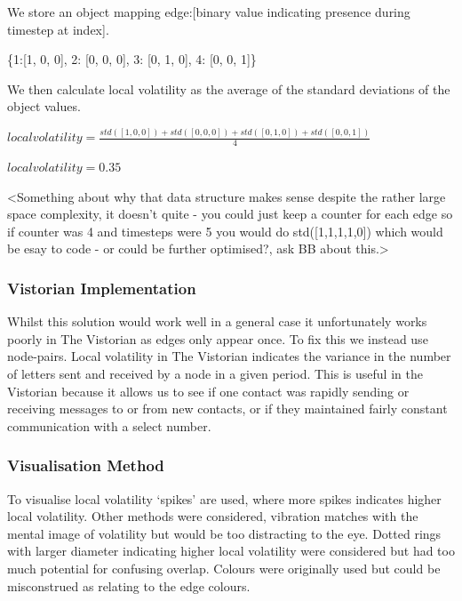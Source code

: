 We store an object mapping edge:[binary value indicating presence during timestep at index].
\begin{center}
\{1:[1, 0, 0], 2: [0, 0, 0], 3: [0, 1, 0], 4: [0, 0, 1]\}
\end{center}
We then calculate local volatility as the average of the standard deviations of the object values.
\begin{center}
$local volatility = \frac{std([1,0,0]) + std([0,0,0]) + std([0,1,0]) + std([0,0,1])}{4}$

$local volatility = 0.35$
\end{center}

<Something about why that data structure makes sense despite the rather large space complexity, it doesn't quite - you could just keep a counter for each edge so if counter was 4 and timesteps were 5 you would do std([1,1,1,1,0]) which would be esay to code - or could be further optimised?, ask BB about this.>

\subsubsection{Vistorian Implementation}
Whilst this solution would work well in a general case it unfortunately works poorly in The Vistorian as edges only appear once. To fix this we instead use node-pairs. 
Local volatility in The Vistorian indicates the variance in the number of letters sent and received by a node in a given period. This is useful in the Vistorian because it allows us to see if one contact was rapidly sending or receiving messages to or from new contacts, or if they maintained fairly constant communication with a select number. 

\subsubsection{Visualisation Method}
To visualise local volatility ‘spikes’ are used, where more spikes indicates higher local volatility. Other methods were considered, vibration matches with the mental image of volatility but would be too distracting to the eye. Dotted rings with larger diameter indicating higher local volatility were considered but had too much potential for confusing overlap. Colours were originally used but could be misconstrued as relating to the edge colours. 


